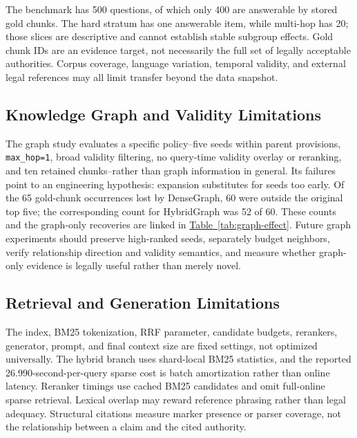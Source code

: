 The benchmark has 500 questions, of which only 400 are answerable by stored
gold chunks. The hard stratum has one answerable item, while multi-hop has 20;
those slices are descriptive and cannot establish stable subgroup effects.
Gold chunk IDs are an evidence target, not necessarily the full set of legally
acceptable authorities. Corpus coverage, language variation, temporal validity,
and external legal references may all limit transfer beyond the data snapshot.

\subsection{Knowledge Graph and Validity Limitations}
\label{sec:graph-validity-limitations}

The graph study evaluates a specific policy--five seeds within parent
provisions, \texttt{max\_hop=1}, broad validity filtering, no query-time
validity overlay or reranking, and ten retained chunks--rather than graph
information in general. Its failures point to an engineering hypothesis:
expansion substitutes for seeds too early. Of the 65 gold-chunk occurrences
lost by DenseGraph, 60 were outside the original top five; the corresponding
count for HybridGraph was 52 of 60. These counts and the graph-only recoveries
are linked in \hyperref[tab:graph-effect]{Table~\ref*{tab:graph-effect}}.
Future graph experiments should preserve high-ranked seeds, separately budget
neighbors, verify relationship direction and validity semantics, and measure
whether graph-only evidence is legally useful rather than merely novel.

\subsection{Retrieval and Generation Limitations}
\label{sec:retrieval-generation-limitations}

The index, BM25 tokenization, RRF parameter, candidate budgets, rerankers,
generator, prompt, and final context size are fixed settings, not optimized
universally. The hybrid branch uses shard-local BM25 statistics, and the
reported 26.990-second-per-query sparse cost is batch amortization rather than
online latency. Reranker timings use cached BM25 candidates and omit
full-online sparse retrieval. Lexical overlap may reward reference phrasing
rather than legal adequacy. Structural citations measure marker presence or
parser coverage, not the relationship between a claim and the cited authority.

